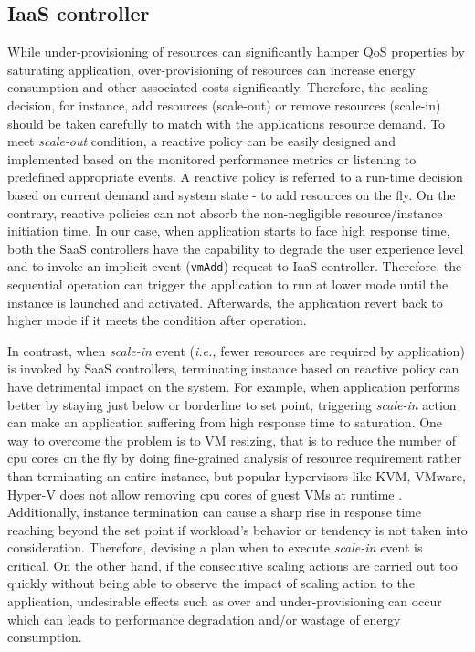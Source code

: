 \subsection{IaaS controller}


While under-provisioning of resources can significantly hamper QoS properties by saturating application, over-provisioning of resources can increase energy consumption and other associated costs significantly. Therefore, the scaling decision, for instance, add resources (scale-out) or remove resources (scale-in) should be taken carefully to match with the applications resource demand. To meet \emph{scale-out} condition, a reactive policy can be easily designed and implemented based on the monitored performance metrics or listening to predefined appropriate events. A reactive policy is referred to a run-time decision based on current demand and system state - to add resources on the fly. On the contrary, reactive policies can not absorb the non-negligible resource/instance initiation time. In our case, when application starts to face high response time, both the SaaS controllers have the capability to degrade the user experience level and to invoke an implicit event (\texttt{vmAdd}) request to IaaS controller. Therefore, the sequential operation can trigger the application to run at lower mode until the instance is launched and activated. Afterwards, the application revert back to higher mode if it meets the condition after operation.

In contrast, when \emph{scale-in} event (\emph{i.e.,} fewer resources are required by application) is invoked by SaaS controllers, terminating instance based on reactive policy can have detrimental impact on the system. For example, when application performs better by staying just below or borderline to set point, triggering \emph{scale-in} action can make an application suffering from high response time to saturation. One way to overcome the problem is to VM resizing, that is to reduce the number of cpu cores on the fly by doing fine-grained analysis of resource requirement rather than terminating an entire instance, but popular hypervisors like KVM, VMware, Hyper-V does not allow removing cpu cores of guest VMs at runtime \cite{vertical}.
Additionally, instance termination can cause a sharp rise in response time reaching beyond the set point if workload's behavior or tendency is not taken into consideration. Therefore, devising a plan when to execute \emph{scale-in} event is critical. On the other hand, if the consecutive scaling actions are carried out too quickly without being able to observe the impact of scaling action to the application, undesirable effects such as over and under-provisioning can occur which can leads to performance degradation and/or wastage of energy consumption.
  
